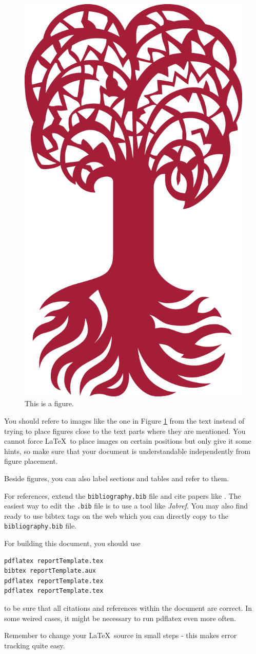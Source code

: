 \documentclass{utue} %
\begin{document}
\begin{figure}[h!]
  \centering
  \includegraphics[width=.4\columnwidth]{images/Tuebingen_CorporateElements/UT_BM_Rot_RGB_tr_01.png}
  \caption{This is a figure.}
  \label{fig:figure1}
\end{figure}

You should refere to images like the one in Figure \ref{fig:figure1} from the text instead of trying to place figures close to the text parts where they are mentioned. You cannot force \LaTeX~to place images on certain positions but only give it some hints, so make sure that your document is understandable independently from figure placement.

Beside figures, you can also label sections and tables and refer to them.

For references, extend the \texttt{bibliography.bib} file and cite papers like \cite{Miller1995}. The easiest way to edit the \texttt{.bib} file is to use a tool like \emph{Jabref}. You may also find ready to use bibtex tags on the web which you can directly copy to the \texttt{bibliography.bib} file.

For building this document, you should use 
\begin{lstlisting}[firstnumber=1]
pdflatex reportTemplate.tex
bibtex reportTemplate.aux
pdflatex reportTemplate.tex
pdflatex reportTemplate.tex
\end{lstlisting}
to be sure that all citations and references within the document are correct. In some weired cases, it might be necessary to run pdflatex even more often.

Remember to change your \LaTeX~source in small steps - this makes error tracking quite easy.




\end{document}
